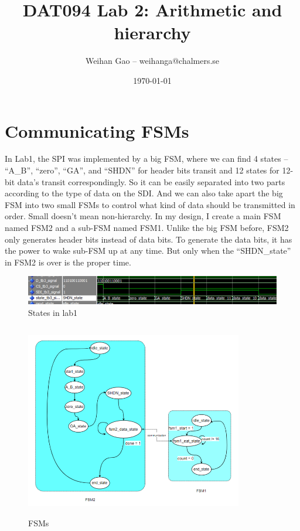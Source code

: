 \documentclass[a4paper]{article}
\title{DAT094 Lab 2: Arithmetic and hierarchy}
\author{Weihan Gao – weihanga@chalmers.se}
\date{\today}
\begin{document}
\sloppy
\maketitle




\section{Communicating FSMs}
\label{sec:introduction}



In Lab1, the SPI was implemented by a big FSM, where we can find 4 states -- “A\_B”, “zero”, “GA”, and “SHDN” for header bits transit and 12 states for 12-bit data’s transit correspondingly. So it can be easily separated into two parts according to the type of data on the SDI. And we can also take apart the big FSM into two small FSMs to control what kind of data should be transmitted in order. Small doesn’t mean non-hierarchy. In my design, I create a main FSM named FSM2 and a sub-FSM named FSM1. Unlike the big FSM before, FSM2 only generates header bits instead of data bits. To generate the data bits, it has the power to wake sub-FSM up at any time. But only when the “SHDN\_state” in FSM2 is over is the proper time. 


\begin{figure}[h]
\centering
\includegraphics[width=1\textwidth]{fig9.png}
\caption{\label{fig:data}States in lab1}
\end{figure}


\begin{figure}[h]
\centering
\includegraphics[width=9.5cm,height=8.5cm]{fig10.png}
\caption{\label{fig:data}FSMs}
\end{figure}
\end{document}
